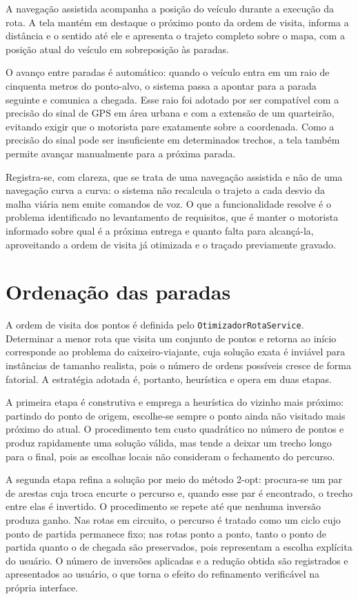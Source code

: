 A navegação assistida acompanha a posição do veículo durante a execução da rota. A tela mantém em destaque o próximo ponto da ordem de visita, informa a distância e o sentido até ele e apresenta o trajeto completo sobre o mapa, com a posição atual do veículo em sobreposição às paradas.

O avanço entre paradas é automático: quando o veículo entra em um raio de cinquenta metros do ponto-alvo, o sistema passa a apontar para a parada seguinte e comunica a chegada. Esse raio foi adotado por ser compatível com a precisão do sinal de GPS em área urbana e com a extensão de um quarteirão, evitando exigir que o motorista pare exatamente sobre a coordenada. Como a precisão do sinal pode ser insuficiente em determinados trechos, a tela também permite avançar manualmente para a próxima parada.

Registra-se, com clareza, que se trata de uma navegação assistida e não de uma navegação curva a curva: o sistema não recalcula o trajeto a cada desvio da malha viária nem emite comandos de voz. O que a funcionalidade resolve é o problema identificado no levantamento de requisitos, que é manter o motorista informado sobre qual é a próxima entrega e quanto falta para alcançá-la, aproveitando a ordem de visita já otimizada e o traçado previamente gravado.

\section{Ordenação das paradas}

A ordem de visita dos pontos é definida pelo \texttt{OtimizadorRotaService}. Determinar a menor rota que visita um conjunto de pontos e retorna ao início corresponde ao problema do caixeiro-viajante, cuja solução exata é inviável para instâncias de tamanho realista, pois o número de ordens possíveis cresce de forma fatorial. A estratégia adotada é, portanto, heurística e opera em duas etapas.

A primeira etapa é construtiva e emprega a heurística do vizinho mais próximo: partindo do ponto de origem, escolhe-se sempre o ponto ainda não visitado mais próximo do atual. O procedimento tem custo quadrático no número de pontos e produz rapidamente uma solução válida, mas tende a deixar um trecho longo para o final, pois as escolhas locais não consideram o fechamento do percurso.

A segunda etapa refina a solução por meio do método 2-opt: procura-se um par de arestas cuja troca encurte o percurso e, quando esse par é encontrado, o trecho entre elas é invertido. O procedimento se repete até que nenhuma inversão produza ganho. Nas rotas em circuito, o percurso é tratado como um ciclo cujo ponto de partida permanece fixo; nas rotas ponto a ponto, tanto o ponto de partida quanto o de chegada são preservados, pois representam a escolha explícita do usuário. O número de inversões aplicadas e a redução obtida são registrados e apresentados ao usuário, o que torna o efeito do refinamento verificável na própria interface.

